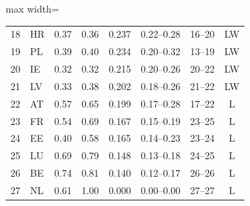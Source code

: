 \begin{table}[pos=t]
\begin{adjustbox}{max width=\linewidth}
\begin{tabular}{@{}rlcccccc@{}}
18 & HR & 0.37 & 0.36 & 0.237 & 0.22--0.28 & 16--20 & LW \\
19 & PL & 0.39 & 0.40 & 0.234 & 0.20--0.32 & 13--19 & LW \\
20 & IE & 0.32 & 0.32 & 0.215 & 0.20--0.26 & 20--22 & LW \\
21 & LV & 0.33 & 0.38 & 0.202 & 0.18--0.26 & 21--22 & LW \\
22 & AT & 0.57 & 0.65 & 0.199 & 0.17--0.28 & 17--22 & L \\
23 & FR & 0.54 & 0.69 & 0.167 & 0.15--0.19 & 23--25 & L \\
24 & EE & 0.40 & 0.58 & 0.165 & 0.14--0.23 & 23--24 & L \\
25 & LU & 0.69 & 0.79 & 0.148 & 0.13--0.18 & 24--25 & L \\
26 & BE & 0.74 & 0.81 & 0.140 & 0.12--0.17 & 26--26 & L \\
27 & NL & 0.61 & 1.00 & 0.000 & 0.00--0.00 & 27--27 & L \\
\bottomrule\end{tabular}\end{adjustbox}\end{table}
